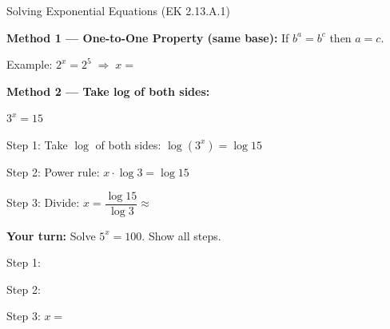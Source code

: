 \documentclass[10pt]{article}
\begin{document}
\begin{notesbox}{Solving Exponential Equations (EK 2.13.A.1)}

\textbf{Method 1 --- One-to-One Property (same base):}
If $b^a = b^c$ then $a = c$.

\vspace{4pt}
Example: \quad $2^x = 2^5 \;\Rightarrow\; x = $ \blank{2cm}

\vspace{8pt}
\textbf{Method 2 --- Take log of both sides:}

\vspace{4pt}
$3^x = 15$

\vspace{4pt}
Step 1: Take $\log$ of both sides: \quad $\log(3^x) = \log 15$

\vspace{4pt}
Step 2: Power rule: \quad $x \cdot \log 3 = \log 15$

\vspace{4pt}
Step 3: Divide: \quad $x = \dfrac{\log 15}{\log 3} \approx $ \blank{2.5cm}

\vspace{10pt}
\textbf{Your turn:} Solve $5^x = 100$. Show all steps.

\vspace{6pt}
Step 1: \writeline

\vspace{4pt}
Step 2: \writeline

\vspace{4pt}
Step 3: $x = $ \blank{4cm}

\end{notesbox}

\vspace{0.06in}
\end{document}
